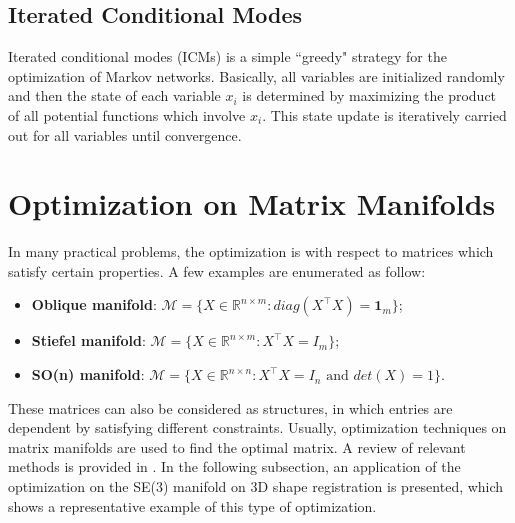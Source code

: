 \subsection{Iterated Conditional Modes}
Iterated conditional modes (ICMs) is a simple ``greedy" strategy for the optimization of Markov networks. Basically, all variables are initialized randomly and then the state 
of each variable $x_i$ is determined by maximizing the product of all potential functions which involve $x_i$. This state update is iteratively carried out for all variables       
until convergence. 

\section{Optimization on Matrix Manifolds}
\label{sec:optimize_matrix}
In many practical problems, the optimization is with respect to matrices which satisfy certain properties.   
A few examples are enumerated as follow:     
\begin{itemize}
	\item \textbf{Oblique manifold}: $\mathcal{M}=\{X\in\mathbb{R}^{n\times m}: diag (X^\top X)=\mathbf{1}_m \}$; 
	\item \textbf{Stiefel manifold}: $\mathcal{M}=\{X\in\mathbb{R}^{n\times m}: X^\top X=I_m \}$; 
	\item \textbf{SO(n) manifold}: $\mathcal{M}=\{X\in\mathbb{R}^{n\times n}: X^\top X=I_n \text{ and } det(X)=1\}$. 
\end{itemize}
These matrices can also be considered as structures, in which entries are dependent by satisfying different constraints.    
Usually, optimization techniques on matrix manifolds are used to find the optimal matrix. A review of relevant methods      
is provided in \cite{matrix_manifold}.  
In the following subsection, an application of the optimization on the SE(3) manifold on 3D shape registration is presented, which 
shows a representative example of this type of optimization.    

